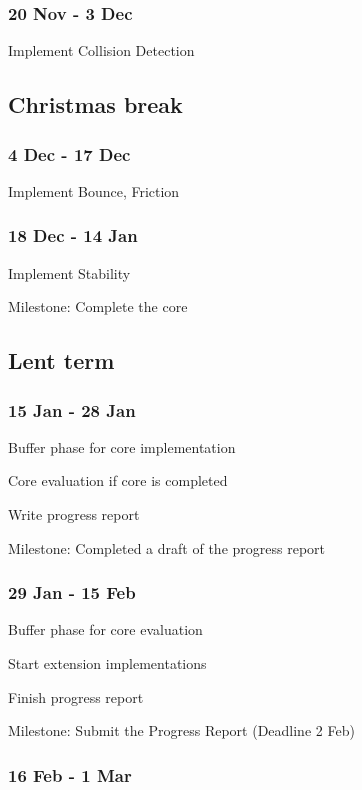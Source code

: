 \documentclass[12pt]{article}
\begin{document}
\subsubsection*{20 Nov - 3 Dec}

Implement Collision Detection

\subsection*{Christmas break}

\subsubsection*{4 Dec - 17 Dec}

Implement Bounce, Friction

\subsubsection*{18 Dec - 14 Jan}

Implement Stability

Milestone: Complete the core

\subsection*{Lent term}

\subsubsection*{15 Jan - 28 Jan}

Buffer phase for core implementation

Core evaluation if core is completed

Write progress report

Milestone: Completed a draft of the progress report

\subsubsection*{29 Jan - 15 Feb}

Buffer phase for core evaluation

Start extension implementations

Finish progress report

Milestone: Submit the Progress Report (Deadline 2 Feb)

\subsubsection*{16 Feb - 1 Mar}
\end{document}
